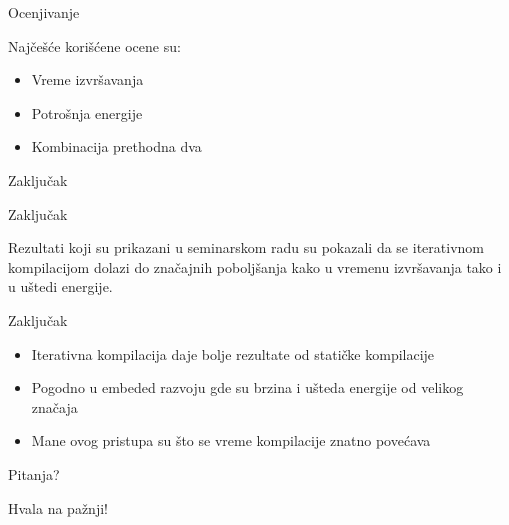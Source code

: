 \documentclass[10pt]{beamer}
\begin{document}
\begin{frame}{Ocenjivanje}

    Najčešće korišćene ocene su:
    \begin{itemize} 
      \item Vreme izvršavanja
      \item Potrošnja energije
      \item Kombinacija prethodna dva
    \end{itemize}

\end{frame}

\begin{frame}[standout]
  Zaključak
\end{frame}

\begin{frame}{Zaključak}

  Rezultati koji su prikazani u seminarskom radu su
  pokazali da se iterativnom kompilacijom dolazi do 
  značajnih poboljšanja kako u vremenu izvršavanja tako i 
  u uštedi energije.

\end{frame}

\begin{frame}{Zaključak}

  \begin{itemize}[<+- | @alert->]
    \item Iterativna kompilacija daje bolje rezultate od statičke kompilacije
    \item Pogodno u embeded razvoju gde su brzina i ušteda energije od velikog značaja
    \item Mane ovog pristupa su što se vreme kompilacije znatno povećava
  \end{itemize}

\end{frame}

\begin{frame}[standout]
  Pitanja?
\end{frame}
\begin{frame}[standout]
  Hvala na pažnji!
\end{frame}
\end{document}
